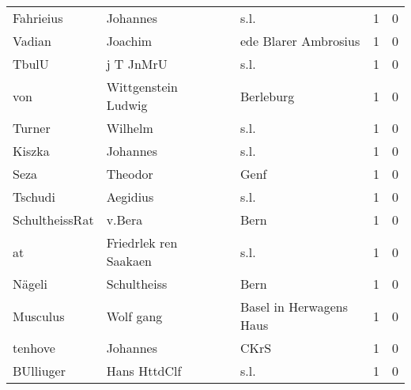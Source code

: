 \documentclass[10pt,a4paper,landscape]{article}
\begin{document}
\begin{longtable}{llllrr}
                Fahrieius &                           Johannes &             &                                        s.l. &          1 &         0 \\
                   Vadian &                            Joachim &             &                        ede Blarer Ambrosius &          1 &         0 \\
                    TbulU &                          j T JnMrU &             &                                        s.l. &          1 &         0 \\
                      von &                Wittgenstein Ludwig &             &                                   Berleburg &          1 &         0 \\
                   Turner &                            Wilhelm &             &                                        s.l. &          1 &         0 \\
                   Kiszka &                           Johannes &             &                                        s.l. &          1 &         0 \\
                     Seza &                            Theodor &             &                                        Genf &          1 &         0 \\
                  Tschudi &                           Aegidius &             &                                        s.l. &          1 &         0 \\
           SchultheissRat &                             v.Bera &             &                                        Bern &          1 &         0 \\
                       at &              Friedrlek ren Saakaen &             &                                        s.l. &          1 &         0 \\
                   Nägeli &                        Schultheiss &             &                                        Bern &          1 &         0 \\
                 Musculus &                          Wolf gang &             &                     Basel in Herwagens Haus &          1 &         0 \\
                  tenhove &                           Johannes &             &                                        CKrS &          1 &         0 \\
                BUlliuger &                       Hans HttdClf &             &                                        s.l. &          1 &         0 \\

\end{longtable}
\end{document}
